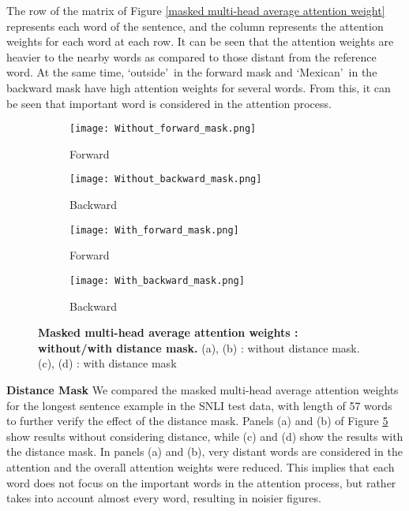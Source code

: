 \documentclass[11pt,letterpaper]{article}
\begin{document}
The row of the matrix of Figure \ref{masked multi-head average attention weight} represents each word of the sentence, and the column represents the attention weights for each word at each row. It can be seen that the attention weights are heavier to the nearby words as compared to those distant from the reference word. At the same time, \lq outside\rq \ in the forward mask and \lq Mexican\rq \ in the backward mask have high attention weights for several words. From this, it can be seen that important word is considered in the attention process.

\begin{figure}[h]
\centering
\begin{subfigure}{.25\textwidth}
  \centering
  \texttt{[image: Without\_forward\_mask.png]}
  \caption{Forward}
  \label{without_forward_mask}
\end{subfigure}\begin{subfigure}{.25\textwidth}
  \centering
  \texttt{[image: Without\_backward\_mask.png]}
  \caption{Backward}
  \label{without_backward_mask}
\end{subfigure}
\begin{subfigure}{.25\textwidth}
  \centering
  \texttt{[image: With\_forward\_mask.png]}
  \caption{Forward}
  \label{with_forward_mask}
\end{subfigure}\begin{subfigure}{.25\textwidth}
  \centering
  \texttt{[image: With\_backward\_mask.png]}
  \caption{Backward}
  \label{with_backward_mask}
\end{subfigure}
\caption{\textbf{Masked multi-head average attention weights : without/with distance mask.} (a), (b) : without distance mask. (c), (d) : with distance mask}
\label{with/without distance mask}
\end{figure}

\textbf{Distance Mask} We compared the masked multi-head average attention weights for the longest sentence example in the SNLI test data, with length of 57 words to further verify the effect of the distance mask. Panels (a) and (b) of Figure \ref{with/without distance mask} show results without considering distance, while (c) and (d) show the results with the distance mask. In  panels (a) and (b), very distant words are considered in the attention and the overall attention weights were reduced. This implies that each word does not focus on the important words in the attention process, but rather takes into account almost every word, resulting in noisier figures.
\end{document}
